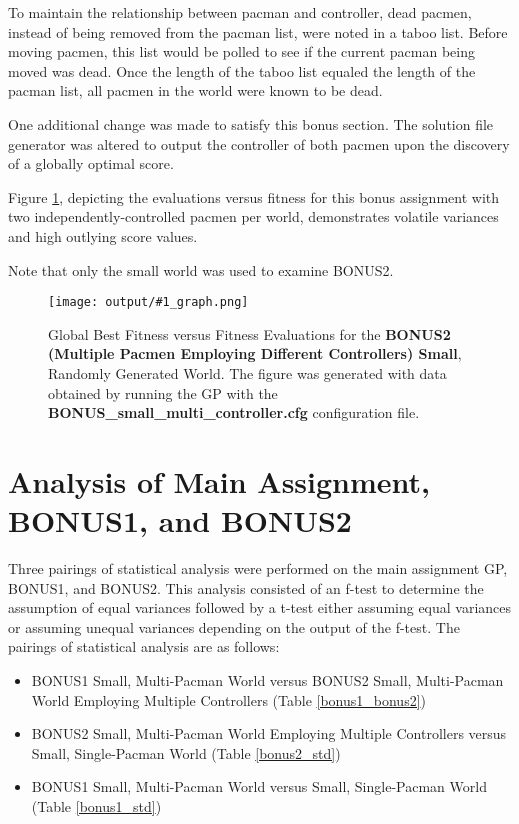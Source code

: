 \documentclass[11pt]{article}
\newcommand{\fitnessplotcaption}[2]{\caption{Global Best Fitness versus Fitness Evaluations for the \textbf{{#1}}, Randomly Generated World. The figure was generated with data obtained by running the GP with the \textbf{{#2}} configuration file.}}
\newcommand{\addgraphic}[1]{\centerline{\texttt{[image: output/\#1\_graph.png]}}}
\begin{document}
To maintain the relationship between pacman and controller, dead pacmen, instead of being
removed from the pacman list, were noted in a taboo list. Before moving pacmen, this list
would be polled to see if the current pacman being moved was dead. Once the length of the
taboo list equaled the length of the pacman list, all pacmen in the world were known to be 
dead.

One additional change was made to satisfy this bonus section. The solution file generator
was altered to output the controller of both pacmen upon the discovery of a globally optimal
score.

Figure \ref{fig:bonus_small_multi}, depicting the evaluations versus fitness for this bonus
assignment with two independently-controlled pacmen per world, demonstrates volatile 
variances and high outlying score values.

Note that only the small world was used to examine BONUS2.


\begin{figure}[H]
    \addgraphic{BONUS_small_multi_controller}
    \fitnessplotcaption{BONUS2 (Multiple Pacmen Employing Different Controllers) Small}{BONUS\_small\_multi\_controller.cfg}
    \label{fig:bonus_small_multi}
\end{figure}


\section{Analysis of Main Assignment, BONUS1, and BONUS2}

Three pairings of statistical analysis were performed on the main assignment GP, BONUS1, and BONUS2. This analysis
consisted of an f-test to determine the assumption of equal variances followed by a t-test either assuming equal variances
or assuming unequal variances depending on the output of the f-test. The pairings of statistical analysis are as follows:

\begin{itemize}
  \item BONUS1 Small, Multi-Pacman World versus BONUS2 Small, Multi-Pacman World Employing Multiple Controllers (Table \ref{bonus1_bonus2})
  \item BONUS2 Small, Multi-Pacman World Employing Multiple Controllers versus Small, Single-Pacman World (Table \ref{bonus2_std})
  \item BONUS1 Small, Multi-Pacman World versus Small, Single-Pacman World (Table \ref{bonus1_std})
\end{itemize}
\end{document}
